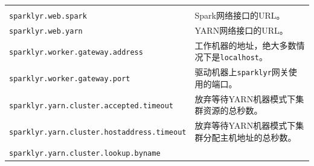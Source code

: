 \documentclass[
]{article}
\begin{document}
\begin{longtable}[]{@{}ll@{}}
\begin{minipage}[t]{0.47\columnwidth}
\end{minipage}\tabularnewline
\begin{minipage}[t]{0.47\columnwidth}\raggedright
\texttt{sparklyr.web.spark}\strut
\end{minipage} & \begin{minipage}[t]{0.47\columnwidth}\raggedright
Spark网络接口的URL。\strut
\end{minipage}\tabularnewline
\begin{minipage}[t]{0.47\columnwidth}\raggedright
\texttt{sparklyr.web.yarn}\strut
\end{minipage} & \begin{minipage}[t]{0.47\columnwidth}\raggedright
YARN网络接口的URL。\strut
\end{minipage}\tabularnewline
\begin{minipage}[t]{0.47\columnwidth}\raggedright
\texttt{sparklyr.worker.gateway.address}\strut
\end{minipage} & \begin{minipage}[t]{0.47\columnwidth}\raggedright
工作机器的地址，绝大多数情况下是\texttt{localhost}。\strut
\end{minipage}\tabularnewline
\begin{minipage}[t]{0.47\columnwidth}\raggedright
\texttt{sparklyr.worker.gateway.port}\strut
\end{minipage} & \begin{minipage}[t]{0.47\columnwidth}\raggedright
驱动机器上\texttt{sparklyr}网关使用的端口。\strut
\end{minipage}\tabularnewline
\begin{minipage}[t]{0.47\columnwidth}\raggedright
\texttt{sparklyr.yarn.cluster.accepted.timeout}\strut
\end{minipage} & \begin{minipage}[t]{0.47\columnwidth}\raggedright
放弃等待YARN机器模式下集群资源的总秒数。\strut
\end{minipage}\tabularnewline
\begin{minipage}[t]{0.47\columnwidth}\raggedright
\texttt{sparklyr.yarn.cluster.hostaddress.timeout}\strut
\end{minipage} & \begin{minipage}[t]{0.47\columnwidth}\raggedright
放弃等待YARN机器模式下集群分配主机地址的总秒数。\strut
\end{minipage}\tabularnewline
\begin{minipage}[t]{0.47\columnwidth}\raggedright
\texttt{sparklyr.yarn.cluster.lookup.byname}\strut
\end{minipage} & \begin{minipage}[t]{0.47\columnwidth}\raggedright

\end{minipage}
\end{longtable}
\end{document}
